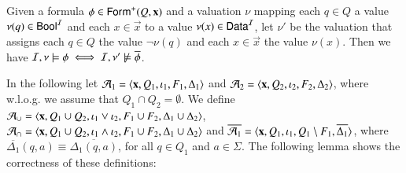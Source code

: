 \documentclass{llncs}
\begin{document}
\begin{proposition}\label{prop:overline}
  Given a formula $\phi \in \mathsf{Form}^+(Q,\mathbf x)$ and a valuation $\nu$
  mapping each $q \in Q$ a value $\nu(q) \in \mathsf{Bool}^{\mathcal{I}}$ and each $x \in
  \vec{x}$ to a value $\nu(x) \in \mathsf{Data}^{\mathcal{I}}$, let $\nu'$ be the
  valuation that assigns each $q \in Q$ the value $\neg\nu(q)$ and
  each $x \in \vec{x}$ the value $\nu(x)$. Then we have 
  $\mathcal{I},\nu \models \phi \iff \mathcal{I},\nu' \not\models \overline{\phi}$. 
\end{proposition}

In the following let $\mathcal{A}_1 = \left\langle \mathbf x,Q_1,\iota_1,F_1,\Delta_1 \right\rangle$
and $\mathcal{A}_2 = \left\langle \mathbf x,Q_2,\iota_2,F_2,\Delta_2 \right\rangle$, where
w.l.o.g. we assume that $Q_1 \cap Q_2 = \emptyset$. We define $\mathcal{A}_\cup
= \left\langle \mathbf x,Q_1\cup Q_2,\iota_1 \vee \iota_2,F_1\cup
  F_2,\Delta_1\cup\Delta_2 \right\rangle$, $\mathcal{A}_\cap = \left\langle \mathbf x,Q_1\cup
  Q_2,\iota_1 \wedge \iota_2, F_1\cup F_2, \Delta_1\cup\Delta_2 \right\rangle$ and
$\overline{\mathcal{A}_1} = \langle \mathbf x,Q_1,\iota_1,Q_1\setminus
F_1,\overline{\Delta_1} \rangle$, where $\overline{\Delta_1}(q,a)
\equiv \overline{\Delta_1(q,a)}$, for all $q \in Q_1$ and $a \in
\Sigma$. The following lemma shows the correctness of these
definitions: 
\end{document}
